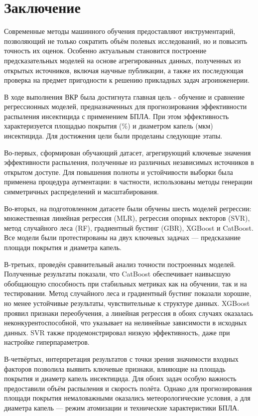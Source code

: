 \chapter*{Заключение} \label{ch-conclusion}


Современные методы машинного обучения предоставляют инструментарий, позволяющий не только сократить объём полевых исследований, но и повысить точность их оценок. Особенно актуальным становится построение предсказательных моделей на основе агрегированных данных, полученных из открытых источников, включая научные публикации, а также их последующая проверка на предмет пригодности к решению прикладных задач агроинженерии.

В ходе выполнения ВКР была достигнута главная цель - обучение и сравнение регрессионных моделей, предназначенных для прогнозирования эффективности распыления инсектицида с применением БПЛА. При этом эффективность характеризуется площадью покрытия (\%) и диаметром капель (мкм) инсектицида. Для достижения цели были проделаны следующие этапы.

Во-первых, сформирован обучающий датасет, агрегирующий ключевые значения эффективности распыления, полученные из различных независимых источников в открытом доступе. Для повышения полноты и устойчивости выборки была применена процедура аугментации: в частности, использованы методы генерации симметричных распределений и масштабирования.

Во-вторых, на подготовленном датасете были обучены шесть моделей регрессии: множественная линейная регрессия (MLR), регрессия опорных векторов (SVR), метод случайного леса (RF), градиентный бустинг (GBR), XGBoost и CatBoost. Все модели были протестированы на двух ключевых задачах --- предсказание площади покрытия и диаметра капель.

В-третьих, проведён сравнительный анализ точности построенных моделей. Полученные результаты показали, что CatBoost обеспечивает наивысшую обобщающую способность при стабильных метриках как на обучении, так и на тестировании. Метод случайного леса и градиентный бустинг показали хорошие, но менее устойчивые результаты, чувствительные к структуре данных. XGBoost проявил признаки переобучения, а линейная регрессия в обоих случаях оказалась неконкурентоспособной, что указывает на нелинейные зависимости в исходных данных. SVR также продемонстрировал низкую эффективность, даже при настройке гиперпараметров.

В-четвёртых, интерпретация результатов с точки зрения значимости входных факторов позволила выявить ключевые признаки, влияющие на площадь покрытия и диаметр капель инсектицида. Для обоих задач особую важность предоставили объём распыления и скорость полёта. Однако для прогнозирования площади покрытия немаловажными оказались метеорологические условия, а для диаметра капель --- режим атомизации и технические характеристики БПЛА.

